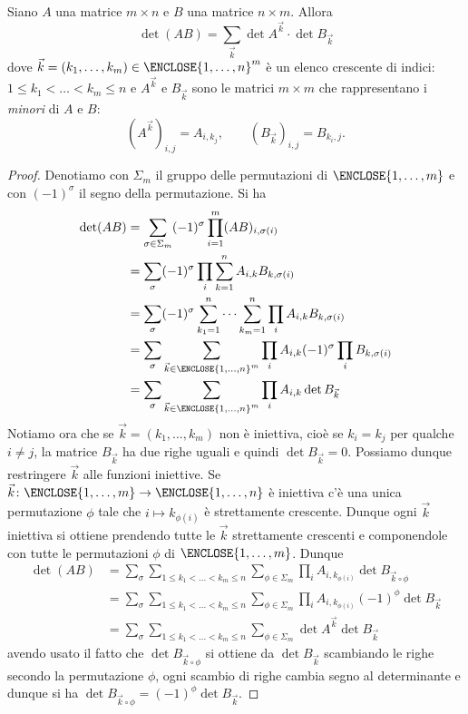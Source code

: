 \begin{theorem}
  Siano $A$ una matrice $m\times n$ e $B$ una matrice $n\times m$.
  Allora 
  \[
    \det (AB) = \sum_{\vec k} \det A^{\vec k}\cdot \det B_{\vec k}
  \]
  dove 
  $\vec k = (k_1,\dots,k_m) \in \ENCLOSE{1,\dots,n}^m$ 
  è un elenco crescente di indici: $1\le k_1 < \dots < k_m\le n$
  e $A^{\vec k}$ e $B_{\vec k}$ sono le matrici $m\times m$ che 
  rappresentano i \emph{minori} di $A$ e $B$:
  \[
    (A^{\vec k})_{i,j} = A_{i,k_j}, \qquad
    (B_{\vec k})_{i,j} = B_{k_i, j}.
  \]
\end{theorem}
\begin{proof}
Denotiamo con $\Sigma_m$ il gruppo delle permutazioni 
di $\ENCLOSE{1,\dots,m}$ 
e con $(-1)^\sigma$ il segno della permutazione.
Si ha
\begin{align*}
  \det (AB) &= \sum_{\sigma \in \Sigma_m} (-1)^\sigma \prod_{i=1}^m (AB)_{i,\sigma(i)} \\
    &= \sum_\sigma (-1)^\sigma \prod_i \sum_{k=1}^n A_{i,k} B_{k,\sigma(i)} \\
    &= \sum_\sigma (-1)^\sigma \sum_{k_1=1}^n \dots \sum_{k_m=1}^n \prod_i A_{i,k} B_{k,\sigma(i)} \\
    &= \sum_\sigma \sum_{\vec k\in \ENCLOSE{1,\dots,n}^m} \prod_i A_{i,k} (-1)^\sigma \prod_i B_{k,\sigma(i)} \\    
    &= \sum_\sigma \sum_{\vec k\in \ENCLOSE{1,\dots,n}^m} \prod_i A_{i,k} \det B_{\vec k}
\end{align*}
Notiamo ora che se $\vec k = (k_1,\dots,k_m)$ non è iniettiva, cioè se $k_i = k_j$ per qualche 
$i\neq j$, la matrice $B_{\vec k}$ ha due righe uguali e quindi $\det B_{\vec k}=0$. 
Possiamo dunque restringere $\vec k$ alle funzioni iniettive.
Se $\vec k\colon\ENCLOSE{1,\dots,m}\to\ENCLOSE{1,\dots,n}$ è iniettiva c'è una 
unica permutazione $\phi$ tale che $i\mapsto k_{\phi(i)}$ è strettamente crescente.
Dunque ogni $\vec k$ iniettiva si ottiene prendendo tutte le $\vec k$ strettamente crescenti 
e componendole con tutte le permutazioni $\phi$ di $\ENCLOSE{1,\dots,m}$. 
Dunque
\begin{align*}
  \det(AB) 
    &= \sum_\sigma \sum_{1\le k_1<\dots<k_m\le n}\sum_{\phi\in \Sigma_m} 
    \prod_i A_{i,k_{\phi(i)}} \det B_{\vec k\circ \phi}\\
    &= \sum_\sigma \sum_{1\le k_1<\dots<k_m\le n}\sum_{\phi\in \Sigma_m} 
    \prod_i A_{i,k_{\phi(i)}} (-1)^\phi \det B_{\vec k}\\
    &= \sum_\sigma \sum_{1\le k_1<\dots<k_m\le n}\sum_{\phi\in \Sigma_m} 
    \det A^{\vec k} \det B_{\vec k}
\end{align*}
avendo usato il fatto che $\det B_{\vec k\circ \phi}$
si ottiene da $\det B_{\vec k}$ scambiando le righe 
secondo la permutazione $\phi$, ogni scambio di righe 
cambia segno al determinante e dunque si ha $\det B_{\vec k\circ \phi} = (-1)^\phi \det B_{\vec k}$.
\end{proof}


